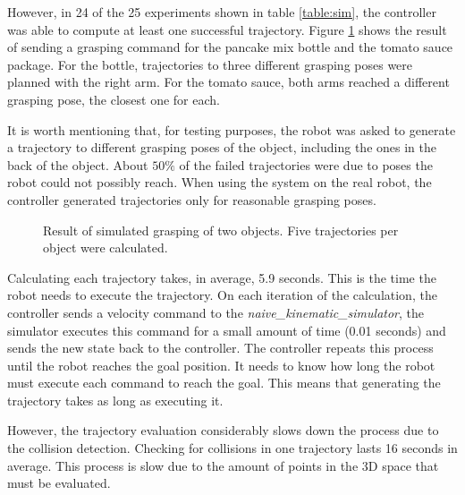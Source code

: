 However, in 24 of the 25 experiments shown in table \ref{table:sim}, the controller was able to compute at least one successful trajectory. Figure \ref{fig:traj_sim} shows the result of sending a grasping command for the pancake mix bottle and the tomato sauce package. For the bottle, trajectories to three different grasping poses were planned with the right arm. For the tomato sauce, both arms reached a different grasping pose, the closest one for each.

It is worth mentioning that, for testing purposes, the robot was asked to generate a trajectory to different grasping poses of the object, including the ones in the back of the object. About $50\%$ of the failed trajectories were due to poses the robot could not possibly reach. When using the system on the real robot, the controller generated trajectories only for reasonable grasping poses.

\begin{figure}[H]
	\centering
	\begin{subfigure}[]
		{\texttt{[image: sim\_result.png]}}
	\end{subfigure}
	\begin{subfigure}[]
		{\texttt{[image: sim\_result2.png]}}
	\end{subfigure}
	\vspace{-10pt}
	\caption[Simulated Trajectories]{Result of simulated grasping of two objects. Five trajectories per object were calculated.}
	\vspace{-15pt}
	\label{fig:traj_sim}
\end{figure}

Calculating each trajectory takes, in average, 5.9 seconds. This is the time the robot needs to execute the trajectory. On each iteration of the calculation, the controller sends a velocity command to the \textit{naive\_kinematic\_simulator}, the simulator executes this command for a small amount of time (0.01 seconds) and sends the new state back to the controller. The controller repeats this process until the robot reaches the goal position. It needs to know how long the robot must execute each command to reach the goal. This means that generating the trajectory takes as long as executing it.

However, the trajectory evaluation considerably slows down the process due to the collision detection. Checking for collisions in one trajectory lasts 16 seconds in average. This process is slow due to the amount of points in the 3D space that must be evaluated.

